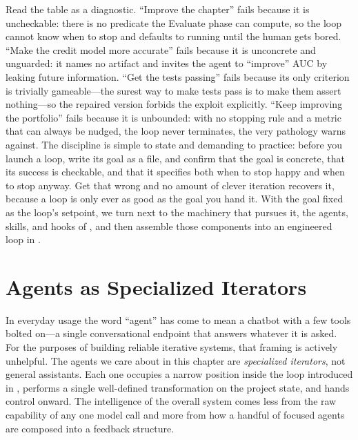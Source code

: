 Read the table as a diagnostic. ``Improve the chapter'' fails because it is uncheckable: there is no predicate the Evaluate phase can compute, so the loop cannot know when to stop and defaults to running until the human gets bored. ``Make the credit model more accurate'' fails because it is unconcrete and unguarded: it names no artifact and invites the agent to ``improve'' AUC by leaking future information. ``Get the tests passing'' fails because its only criterion is trivially gameable---the surest way to make tests pass is to make them assert nothing---so the repaired version forbids the exploit explicitly. ``Keep improving the portfolio'' fails because it is unbounded: with no stopping rule and a metric that can always be nudged, the loop never terminates, the very pathology  warns against. The discipline is simple to state and demanding to practice: before you launch a loop, write its goal as a file, and confirm that the goal is concrete, that its success is checkable, and that it specifies both when to stop happy and when to stop anyway. Get that wrong and no amount of clever iteration recovers it, because a loop is only ever as good as the goal you hand it. With the goal fixed as the loop's setpoint, we turn next to the machinery that pursues it, the agents, skills, and hooks of , and then assemble those components into an engineered loop in .

\section{Agents as Specialized Iterators}\label{sec:agents-as-iterators}

In everyday usage the word ``agent'' has come to mean a chatbot with a few tools bolted on---a single conversational endpoint that answers whatever it is asked. For the purposes of building reliable iterative systems, that framing is actively unhelpful. The agents we care about in this chapter are \emph{specialized iterators}, not general assistants. Each one occupies a narrow position inside the loop introduced in , performs a single well-defined transformation on the project state, and hands control onward. The intelligence of the overall system comes less from the raw capability of any one model call and more from how a handful of focused agents are composed into a feedback structure.

